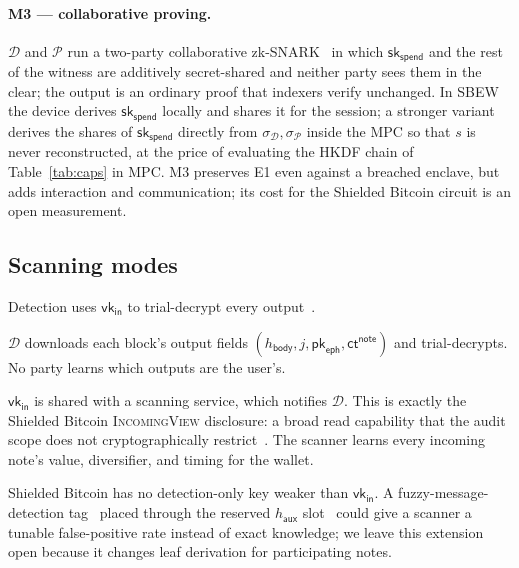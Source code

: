 \documentclass[11pt]{article}
\theoremstyle{remark}
\newcommand{\sk}{\mathsf{sk}}
\newcommand{\vk}{\mathsf{vk}}
\newcommand{\SB}{Shielded Bitcoin}
\newcommand{\sysname}{\textsf{SBEW}}
\begin{document}
\paragraph{M3 --- collaborative proving.} $\mathcal{D}$ and $\mathcal{P}$ run a two-party collaborative zk-SNARK~\cite{ob22} in which $\sk_{\mathsf{spend}}$ and the rest of the witness are additively secret-shared and neither party sees them in the clear; the output is an ordinary proof that indexers verify unchanged. In \sysname{} the device derives $\sk_{\mathsf{spend}}$ locally and shares it for the session; a stronger variant derives the shares of $\sk_{\mathsf{spend}}$ directly from $\sigma_{\mathcal{D}}, \sigma_{\mathcal{P}}$ inside the MPC so that $s$ is never reconstructed, at the price of evaluating the HKDF chain of Table~\ref{tab:caps} in MPC. M3 preserves E1 even against a breached enclave, but adds interaction and communication; its cost for the \SB{} circuit is an open measurement.

\subsection{Scanning modes}
Detection uses $\vk_{\mathsf{in}}$ to trial-decrypt every output~\cite[§16.1]{sb26}.
\begin{description}[leftmargin=1em,style=nextline]
  \item[V0 --- local scan.] $\mathcal{D}$ downloads each block's output fields $(h_{\mathsf{body}}, j, \mathsf{pk}_{\mathsf{eph}}, \mathsf{ct}^{\mathsf{note}})$ and trial-decrypts. No party learns which outputs are the user's.
  \item[V1 --- delegated scan.] $\vk_{\mathsf{in}}$ is shared with a scanning service, which notifies $\mathcal{D}$. This is exactly the \SB{} \textsc{IncomingView} disclosure: a broad read capability that the audit scope does not cryptographically restrict~\cite[§7]{sb26}. The scanner learns every incoming note's value, diversifier, and timing for the wallet.
\end{description}
\SB{} has no detection-only key weaker than $\vk_{\mathsf{in}}$. A fuzzy-message-detection tag~\cite{fmd21} placed through the reserved $h_{\mathsf{aux}}$ slot~\cite[§22.5]{sb26} could give a scanner a tunable false-positive rate instead of exact knowledge; we leave this extension open because it changes leaf derivation for participating notes.
\end{document}
